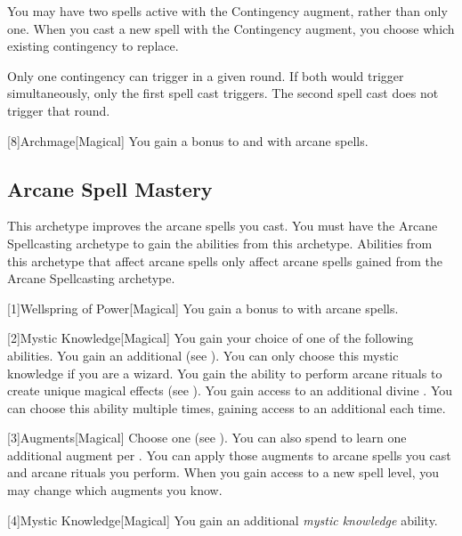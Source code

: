          You may have two spells active with the Contingency augment, rather than only one.
        When you cast a new spell with the Contingency augment, you choose which existing contingency to replace.

        Only one contingency can trigger in a given round.
        If both would trigger simultaneously, only the first spell cast triggers.
        The second spell cast does not trigger that round.

        [8]{Archmage}[Magical]
        You gain a  bonus to  and  with arcane spells.

    \subsection{Arcane Spell Mastery}
        This archetype improves the arcane spells you cast.
        You must have the Arcane Spellcasting archetype to gain the abilities from this archetype.
        Abilities from this archetype that affect arcane spells only affect arcane spells gained from the Arcane Spellcasting archetype.

        [1]{Wellspring of Power}[Magical]
        You gain a  bonus to  with arcane spells.

        [2]{Mystic Knowledge}[Magical]
        You gain your choice of one of the following abilities.
        {
             You gain an additional  (see ).
             You can only choose this mystic knowledge if you are a wizard.
                You gain the ability to perform arcane rituals to create unique magical effects (see ).
             You gain access to an additional divine .
                You can choose this ability multiple times, gaining access to an additional  each time.
        }

        [3]{Augments}[Magical]
        Choose one  (see ).
        You can also spend  to learn one additional augment per .
        You can apply those augments to arcane spells you cast and arcane rituals you perform.
        When you gain access to a new spell level, you may change which augments you know.

        [4]{Mystic Knowledge}[Magical]
        You gain an additional \textit{mystic knowledge} ability.

